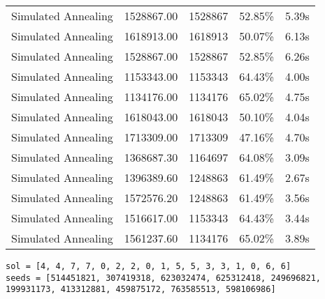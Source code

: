 \begin{table}[ht]
\begin{tabular}{|r|r|r|r|r|}
Simulated Annealing & 1528867.00 & 1528867 & 52.85\% & 5.39s\\
Simulated Annealing & 1618913.00 & 1618913 & 50.07\% & 6.13s\\
Simulated Annealing & 1528867.00 & 1528867 & 52.85\% & 6.26s\\
Simulated Annealing & 1153343.00 & 1153343 & 64.43\% & 4.00s\\
Simulated Annealing & 1134176.00 & 1134176 & 65.02\% & 4.75s\\
Simulated Annealing & 1618043.00 & 1618043 & 50.10\% & 4.04s\\
Simulated Annealing & 1713309.00 & 1713309 & 47.16\% & 4.70s\\
Simulated Annealing & 1368687.30 & 1164697 & 64.08\% & 3.09s\\
Simulated Annealing & 1396389.60 & 1248863 & 61.49\% & 2.67s\\
Simulated Annealing & 1572576.20 & 1248863 & 61.49\% & 3.56s\\
Simulated Annealing & 1516617.00 & 1153343 & 64.43\% & 3.44s\\
Simulated Annealing & 1561237.60 & 1134176 & 65.02\% & 3.89s\\
\end{tabular}%
\end{table}
\begin{lstlisting}[label={lst:call7vehicle3},caption=Optimal solution call\_7\_vehicle\_3]
sol = [4, 4, 7, 7, 0, 2, 2, 0, 1, 5, 5, 3, 3, 1, 0, 6, 6]
seeds = [514451821, 307419318, 623032474, 625312418, 249696821, 199931173, 413312881, 459875172, 763585513, 598106986]
\end{lstlisting}%
\clearpage


